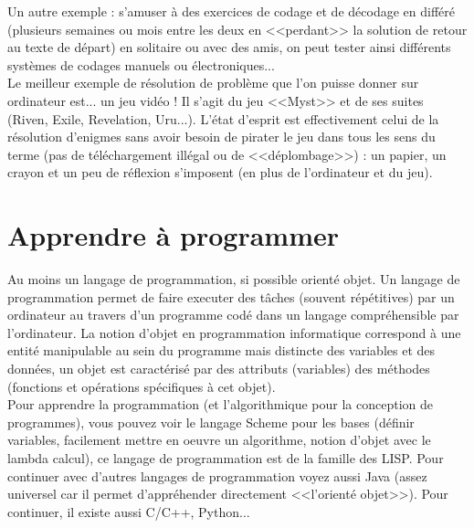 \documentclass[11pt,twoside,a4paper]{article}
\begin{document}
		Un autre exemple : s'amuser {\`a} des exercices de codage et de d{\'e}codage en diff{\'e}r{\'e} (plusieurs semaines ou mois entre les deux en <<perdant>> la solution de retour au texte de d{\'e}part) en solitaire ou avec des amis, on peut tester ainsi diff{\'e}rents syst{\`e}mes de codages manuels ou {\'e}lectroniques...~\\

		Le meilleur exemple de r{\'e}solution de probl{\`e}me que l'on puisse donner sur ordinateur est... un jeu vid{\'e}o ! Il s'agit du jeu <<Myst>> et de ses suites (Riven, Exile, Revelation, Uru...). L'{\'e}tat d'esprit est effectivement celui de la r{\'e}solution d'enigmes sans avoir besoin de pirater le jeu dans tous les sens du terme (pas de t{\'e}l{\'e}chargement ill{\'e}gal ou de <<d{\'e}plombage>>) : un papier, un crayon et un peu de r{\'e}flexion s'imposent (en plus de l'ordinateur et du jeu). ~\\

\section{Apprendre {\`a} programmer}
		Au moins un langage de programmation, si possible orient{\'e} objet. Un langage de programmation permet de faire executer des t{\^a}ches (souvent r{\'e}p{\'e}titives) par un ordinateur au travers d'un programme cod{\'e} dans un langage compr{\'e}hensible par l'ordinateur. La notion d'objet en programmation informatique correspond {\`a} une entit{\'e} manipulable au sein du programme mais distincte des variables et des donn{\'e}es, un objet est caract{\'e}ris{\'e} par des attributs (variables) des m{\'e}thodes (fonctions et op{\'e}rations sp{\'e}cifiques {\`a} cet objet). ~\\

		Pour apprendre la programmation (et l'algorithmique pour la conception de programmes), vous pouvez voir le langage Scheme pour les bases (d{\'e}finir variables, facilement mettre en oeuvre un algorithme, notion d'objet avec le lambda calcul), ce langage de programmation est de la famille des LISP. Pour continuer avec d'autres langages de programmation voyez aussi Java (assez universel car il permet d'appr{\'e}hender directement <<l'orient{\'e} objet>>). Pour continuer, il existe aussi C/C++, Python...~\\
\end{document}
